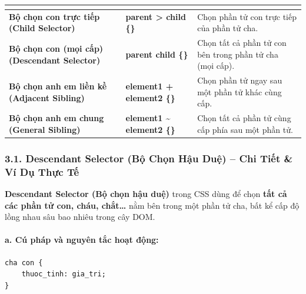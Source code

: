 \begin{prettyTableBox}
\sffamily\small
\begin{tabularx}{\linewidth}{|>{\bfseries\color{primaryBlue}}K{4.2cm}|>{\ttfamily\color{darkText}\bfseries}K{3.0cm}|Z|}
\hline
{}  &  &  \\
\hline
Bộ chọn con trực tiếp (Child Selector) & parent > child \{\} & Chọn phần tử con trực tiếp của phần tử cha. \\
\hline
Bộ chọn con (mọi cấp) (Descendant Selector) & parent child \{\} & Chọn tất cả phần tử con bên trong phần tử cha (mọi cấp). \\
\hline
Bộ chọn anh em liền kề (Adjacent Sibling) & element1 + element2 \{\} & Chọn phần tử ngay sau một phần tử khác cùng cấp. \\
\hline
Bộ chọn anh em chung (General Sibling) & element1 \textasciitilde{} element2 \{\} & Chọn tất cả phần tử cùng cấp phía sau một phần tử. \\
\hline
\end{tabularx}
\end{prettyTableBox}

\subsubsection{3.1. Descendant Selector (Bộ Chọn Hậu Duệ) -- Chi Tiết \& Ví Dụ Thực Tế}

\begin{conceptBox}
\textbf{Descendant Selector (Bộ chọn hậu duệ)} trong CSS dùng để chọn \textbf{tất cả các phần tử con, cháu, chắt\ldots} nằm bên trong một phần tử cha, bất kể cấp độ lồng nhau sâu bao nhiêu trong cây DOM.
\end{conceptBox}

\paragraph{a. Cú pháp và nguyên tắc hoạt động:}
\begin{codeWindow}
\begin{lstlisting}[language=CSS3]
cha con {
    thuoc_tinh: gia_tri;
}
\end{lstlisting}
\end{codeWindow}

